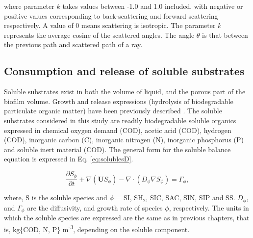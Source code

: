 where parameter $k$ takes values between -1.0 and 1.0 included, with negative or positive values corresponding to back-scattering and forward scattering respectively. A value of 0 means scattering is isotropic. The parameter $k$ represents the average cosine of the scattered angles. The angle $\theta$ is that between the previous path and scattered path of a ray.

\subsection{Consumption and release of soluble substrates}
Soluble substrates exist in both the volume of liquid, and the porous part of the biofilm volume. Growth and release expressions (hydrolysis of biodegradable particulate organic matter) have been previously described \cite{puyol2017}. The soluble substrates considered in this study are readily biodegradable soluble organics expressed in chemical oxygen demand (COD), acetic acid (COD), hydrogen (COD), inorganic carbon (C), inorganic nitrogen (N), inorganic phosphorus (P) and soluble inert material (COD). The general form for the soluble balance equation is expressed in Eq. \ref{eq:solublesD}.

\begin{equation}
\label{eq:solublesD}
\frac{\partial S_{\phi}}{\partial t} + \nabla (\mathbf{U} S_{\phi}) - \nabla \cdot (D_{\phi} \nabla S_{\phi}) = \Gamma_{\phi}, 
\end{equation}

where, S is the soluble species and ${\phi}$ = SI, SH${_2}$, SIC, SAC, SIN, SIP and SS. ${D_{\phi}}$, and ${\Gamma_{\phi}}$ are the diffusivity, and growth rate of species ${\phi}$, respectively. The units in which the soluble species are expressed are the same as in previous chapters, that is, kg\{COD, N, P\} m\textsuperscript{-3}, depending on the soluble component. 



